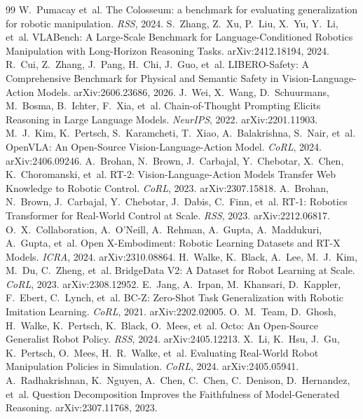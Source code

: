 \begin{thebibliography}{99}
 W.~Pumacay et~al. The Colosseum: a benchmark for evaluating generalization for robotic manipulation. \emph{RSS}, 2024.
 S.~Zhang, Z.~Xu, P.~Liu, X.~Yu, Y.~Li, et~al. {VLABench}: A Large-Scale Benchmark for Language-Conditioned Robotics Manipulation with Long-Horizon Reasoning Tasks. arXiv:2412.18194, 2024.
 R.~Cui, Z.~Zhang, J.~Pang, H.~Chi, J.~Guo, et~al. {LIBERO-Safety}: A Comprehensive Benchmark for Physical and Semantic Safety in Vision-Language-Action Models. arXiv:2606.23686, 2026.
 J.~Wei, X.~Wang, D.~Schuurmans, M.~Bosma, B.~Ichter, F.~Xia, et~al. Chain-of-Thought Prompting Elicits Reasoning in Large Language Models. \emph{NeurIPS}, 2022. arXiv:2201.11903.
 M.~J.~Kim, K.~Pertsch, S.~Karamcheti, T.~Xiao, A.~Balakrishna, S.~Nair, et~al. OpenVLA: An Open-Source Vision-Language-Action Model. \emph{CoRL}, 2024. arXiv:2406.09246.
 A.~Brohan, N.~Brown, J.~Carbajal, Y.~Chebotar, X.~Chen, K.~Choromanski, et~al. RT-2: Vision-Language-Action Models Transfer Web Knowledge to Robotic Control. \emph{CoRL}, 2023. arXiv:2307.15818.
 A.~Brohan, N.~Brown, J.~Carbajal, Y.~Chebotar, J.~Dabis, C.~Finn, et~al. RT-1: Robotics Transformer for Real-World Control at Scale. \emph{RSS}, 2023. arXiv:2212.06817.
 O.~X.~Collaboration, A.~O'Neill, A.~Rehman, A.~Gupta, A.~Maddukuri, A.~Gupta, et~al. Open X-Embodiment: Robotic Learning Datasets and RT-X Models. \emph{ICRA}, 2024. arXiv:2310.08864.
 H.~Walke, K.~Black, A.~Lee, M.~J.~Kim, M.~Du, C.~Zheng, et~al. BridgeData V2: A Dataset for Robot Learning at Scale. \emph{CoRL}, 2023. arXiv:2308.12952.
 E.~Jang, A.~Irpan, M.~Khansari, D.~Kappler, F.~Ebert, C.~Lynch, et~al. BC-Z: Zero-Shot Task Generalization with Robotic Imitation Learning. \emph{CoRL}, 2021. arXiv:2202.02005.
 O.~M.~Team, D.~Ghosh, H.~Walke, K.~Pertsch, K.~Black, O.~Mees, et~al. Octo: An Open-Source Generalist Robot Policy. \emph{RSS}, 2024. arXiv:2405.12213.
 X.~Li, K.~Hsu, J.~Gu, K.~Pertsch, O.~Mees, H.~R.~Walke, et~al. Evaluating Real-World Robot Manipulation Policies in Simulation. \emph{CoRL}, 2024. arXiv:2405.05941.
 A.~Radhakrishnan, K.~Nguyen, A.~Chen, C.~Chen, C.~Denison, D.~Hernandez, et~al. Question Decomposition Improves the Faithfulness of Model-Generated Reasoning. arXiv:2307.11768, 2023.

\end{thebibliography}
